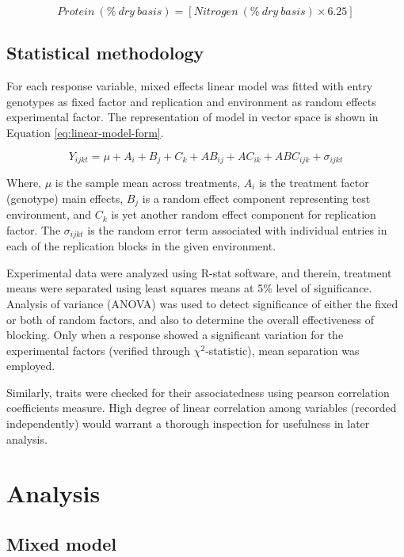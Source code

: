 \documentclass[
]{article}
\begin{document}
\[Protein~(\%~dry~basis) =[Nitrogen~(\%~dry~basis)\times 6.25 ]\]

\hypertarget{statistical-methodology}{%
\subsection{Statistical methodology}\label{statistical-methodology}}

For each response variable, mixed effects linear model was fitted with entry genotypes as fixed factor and replication and environment as random effects experimental factor. The representation of model in vector space is shown in Equation \eqref{eq:linear-model-form}.

\begin{equation}
Y_{ijkt} = \mu + A_{i} + B_{j} + C_{k} + AB_{ij} + AC_{ik} + ABC_{ijk} + \sigma_{ijkt}
\label{eq:linear-model-form}
\end{equation}

Where, \(\mu\) is the sample mean across treatments, \(A_{i}\) is the treatment factor (genotype) main effects, \(B_{j}\) is a random effect component representing test environment, and \(C_{k}\) is yet another random effect component for replication factor. The \(\sigma_{ijkt}\) is the random error term associated with individual entries in each of the replication blocks in the given environment.

Experimental data were analyzed using R-stat software, and therein, treatment means were separated using least squares means at 5\% level of significance. Analysis of variance (ANOVA) was used to detect significance of either the fixed or both of random factors, and also to determine the overall effectiveness of blocking. Only when a response showed a significant variation for the experimental factors (verified through \(\chi^2\)-statistic), mean separation was employed.

Similarly, traits were checked for their associatedness using pearson correlation coefficients measure. High degree of linear correlation among variables (recorded independently) would warrant a thorough inspection for usefulness in later analysis.

\hypertarget{analysis}{%
\section{Analysis}\label{analysis}}

\hypertarget{mixed-model}{%
\subsection{Mixed model}\label{mixed-model}}
\end{document}
